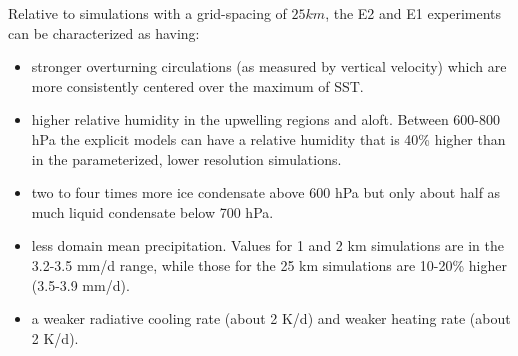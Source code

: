 \documentclass[draft]{agujournal2019}
\begin{document}
Relative to simulations with a grid-spacing of $25 \textit{km}$, the E2 and E1 experiments can be characterized as having: 
\begin{itemize}
  \item stronger overturning circulations (as measured by vertical velocity) which are more consistently centered over the maximum of SST.  
  \item higher relative humidity in the upwelling regions and aloft.   Between 600-800 hPa the explicit models can have a relative humidity 
  that is 40\% higher than in the parameterized, lower resolution simulations.  
  \item two to four times more ice condensate above 600 hPa but only about half as much liquid condensate below 700 hPa.
  \item less domain mean precipitation.  Values for 1 and 2 km simulations are in the 3.2-3.5 mm/d range, while those for the 25 km 
  simulations are 10-20\% higher (3.5-3.9 mm/d).  
  \item a weaker radiative cooling rate (about 2 K/d) and weaker heating rate (about 2 K/d).
\end{itemize}
\end{document}
